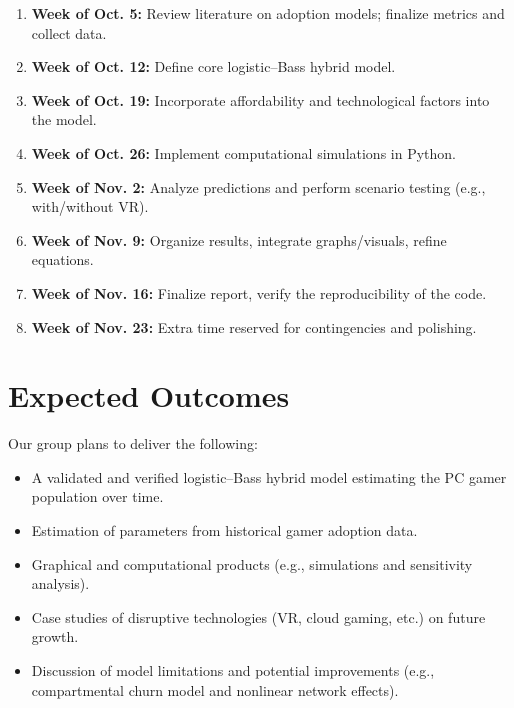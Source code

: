 \documentclass{article}
\begin{document}
\begin{enumerate} [nosep]
    \item \textbf{Week of Oct. 5:} Review literature on adoption models; finalize metrics and collect data.
    \item \textbf{Week of Oct. 12:} Define core logistic--Bass hybrid model.
    \item \textbf{Week of Oct. 19:} Incorporate affordability and technological factors into the model.
    \item \textbf{Week of Oct. 26:} Implement computational simulations in Python.
    \item \textbf{Week of Nov. 2:} Analyze predictions and perform scenario testing (e.g., with/without VR).
    \item \textbf{Week of Nov. 9:} Organize results, integrate graphs/visuals, refine equations.
    \item \textbf{Week of Nov. 16:} Finalize report, verify the reproducibility of the code.
    \item \textbf{Week of Nov. 23:} Extra time reserved for contingencies and polishing.
\end{enumerate}



\section{Expected Outcomes}
Our group plans to deliver the following: 
\begin{itemize} [nosep]
    \item A validated and verified logistic–Bass hybrid model estimating the PC gamer population over time.
    \item Estimation of parameters from historical gamer adoption data.
    \item Graphical and computational products (e.g., simulations and sensitivity analysis).
    \item Case studies of disruptive technologies (VR, cloud gaming, etc.) on future growth.
    \item Discussion of model limitations and potential improvements (e.g., compartmental churn model and nonlinear network effects).

\end{itemize}


\end{document}
